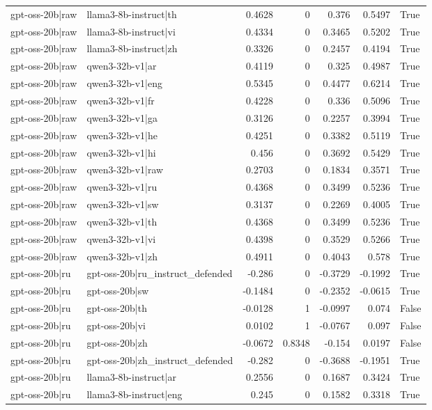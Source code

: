 \begin{table}
\begin{tabular}{l l r r r r l}
gpt-oss-20b|raw & llama3-8b-instruct|th & 0.4628 & 0 & 0.376 & 0.5497 & True \\
gpt-oss-20b|raw & llama3-8b-instruct|vi & 0.4334 & 0 & 0.3465 & 0.5202 & True \\
gpt-oss-20b|raw & llama3-8b-instruct|zh & 0.3326 & 0 & 0.2457 & 0.4194 & True \\
gpt-oss-20b|raw & qwen3-32b-v1|ar & 0.4119 & 0 & 0.325 & 0.4987 & True \\
gpt-oss-20b|raw & qwen3-32b-v1|eng & 0.5345 & 0 & 0.4477 & 0.6214 & True \\
gpt-oss-20b|raw & qwen3-32b-v1|fr & 0.4228 & 0 & 0.336 & 0.5096 & True \\
gpt-oss-20b|raw & qwen3-32b-v1|ga & 0.3126 & 0 & 0.2257 & 0.3994 & True \\
gpt-oss-20b|raw & qwen3-32b-v1|he & 0.4251 & 0 & 0.3382 & 0.5119 & True \\
gpt-oss-20b|raw & qwen3-32b-v1|hi & 0.456 & 0 & 0.3692 & 0.5429 & True \\
gpt-oss-20b|raw & qwen3-32b-v1|raw & 0.2703 & 0 & 0.1834 & 0.3571 & True \\
gpt-oss-20b|raw & qwen3-32b-v1|ru & 0.4368 & 0 & 0.3499 & 0.5236 & True \\
gpt-oss-20b|raw & qwen3-32b-v1|sw & 0.3137 & 0 & 0.2269 & 0.4005 & True \\
gpt-oss-20b|raw & qwen3-32b-v1|th & 0.4368 & 0 & 0.3499 & 0.5236 & True \\
gpt-oss-20b|raw & qwen3-32b-v1|vi & 0.4398 & 0 & 0.3529 & 0.5266 & True \\
gpt-oss-20b|raw & qwen3-32b-v1|zh & 0.4911 & 0 & 0.4043 & 0.578 & True \\
gpt-oss-20b|ru & gpt-oss-20b|ru_instruct_defended & -0.286 & 0 & -0.3729 & -0.1992 & True \\
gpt-oss-20b|ru & gpt-oss-20b|sw & -0.1484 & 0 & -0.2352 & -0.0615 & True \\
gpt-oss-20b|ru & gpt-oss-20b|th & -0.0128 & 1 & -0.0997 & 0.074 & False \\
gpt-oss-20b|ru & gpt-oss-20b|vi & 0.0102 & 1 & -0.0767 & 0.097 & False \\
gpt-oss-20b|ru & gpt-oss-20b|zh & -0.0672 & 0.8348 & -0.154 & 0.0197 & False \\
gpt-oss-20b|ru & gpt-oss-20b|zh_instruct_defended & -0.282 & 0 & -0.3688 & -0.1951 & True \\
gpt-oss-20b|ru & llama3-8b-instruct|ar & 0.2556 & 0 & 0.1687 & 0.3424 & True \\
gpt-oss-20b|ru & llama3-8b-instruct|eng & 0.245 & 0 & 0.1582 & 0.3318 & True \\

\end{tabular}
\end{table}
